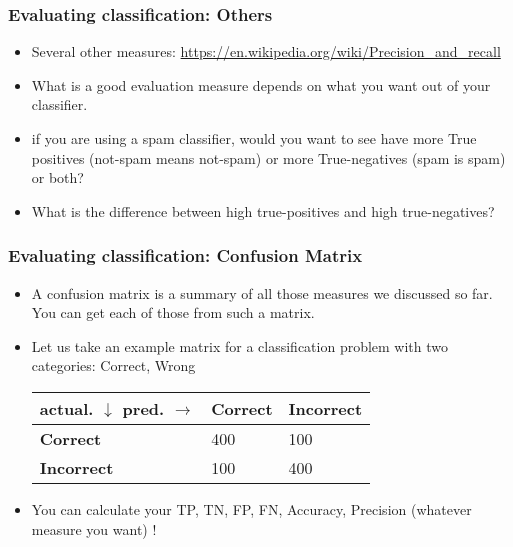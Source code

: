 \documentclass{beamer}
\begin{document}
\begin{frame}
\frametitle{Evaluating classification: Others}
\begin{itemize}
\item Several other measures: \url{https://en.wikipedia.org/wiki/Precision_and_recall}
\item What is a good evaluation measure depends on what you want out of your classifier. \pause
\item if you are using a spam classifier, would you want to see have more True positives (not-spam means not-spam) or more True-negatives (spam is spam) or both? \pause
\item What is the difference between high true-positives and high true-negatives? 
\end{itemize}
\end{frame}

\begin{frame}
\frametitle{Evaluating classification: Confusion Matrix}
\begin{itemize}
\item A confusion matrix is a summary of all those measures we discussed so far. You can get each of those from such a matrix. 
\item Let us take an example matrix for a classification problem with two categories: Correct, Wrong
\begin{table}[h]
\begin{center}
\begin{tabular}{lll}
    actual. $\downarrow$ pred. $\rightarrow$&\textbf{Correct}&\textbf{Incorrect}\\
    \hline
    \textbf{Correct}&400&100\\ \hline
    \textbf{Incorrect}&100&400\\ \hline
    \end{tabular}
    \end{center}
\end{table}
\item You can calculate your TP, TN, FP, FN, Accuracy, Precision (whatever measure you want) !
\end{itemize}
\end{frame}
\end{document}
